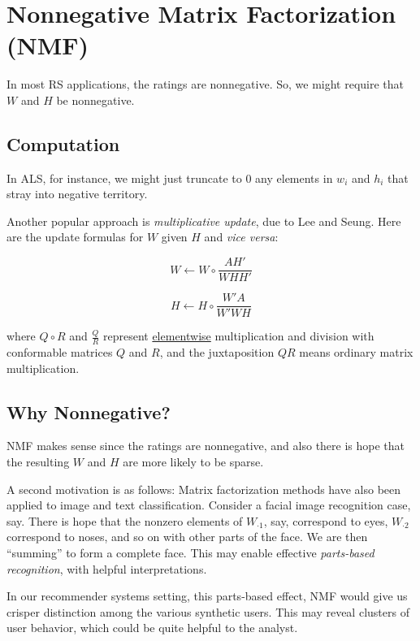 \section{Nonnegative Matrix Factorization (NMF)}

In most RS applications, the ratings are nonnegative.  So, we might
require that $W$ and $H$ be nonnegative.  

\subsection{Computation}

In ALS, for instance, we might just truncate to 0 any elements in $w_i$
and $h_i$ that stray into negative territory.  

Another popular approach is {\it multiplicative update}, due to Lee and
Seung.  Here are the update formulas for $W$ given $H$ and {\it vice
versa}:

\begin{equation}
W \leftarrow W \circ 
\frac
{AH'}
{WHH'}
\end{equation}

\begin{equation}
H \leftarrow H \circ 
\frac
{W'A}
{W'WH}
\end{equation}

where $Q \circ R$ and $\frac{Q}{R}$ represent \underline{elementwise}
multiplication and division with conformable matrices $Q$ and $R$, and
the juxtaposition $QR$ means ordinary matrix multiplication.  


\subsection{Why Nonnegative?}

NMF makes sense since the ratings are nonnegative, and also there is
hope that the resulting $W$ and $H$ are more likely to be sparse.

A second motivation is as follows:  Matrix factorization methods have
also been applied to image and text classification.  Consider 
a facial image recognition case, say.  There is hope that 
the nonzero elements of $W_{\cdot 1}$, say, correspond to eyes, $W_{\cdot
2}$ correspond to noses, and so on with other parts of the face.  We are
then ``summing'' to form a complete face.  This may enable effective
{\it parts-based recognition}, with helpful interpretations.

In our recommender systems setting, this parts-based effect, NMF would
give us crisper distinction among the various synthetic users.  This may
reveal clusters of user behavior, which could be quite helpful to the
analyst.

